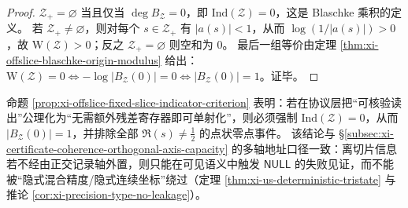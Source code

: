 \begin{proof}
\(\mathcal Z_{+}=\varnothing\) 当且仅当 \(\deg B_{\mathcal Z}=0\)，即 \(\mathrm{Ind}(\mathcal Z)=0\)，这是 Blaschke 乘积的定义。
若 \(\mathcal Z_{+}\neq\varnothing\)，则对每个 \(s\in\mathcal Z_{+}\) 有 \(|a(s)|<1\)，从而 \(\log(1/|a(s)|)>0\)，故 \(\mathrm{W}(\mathcal Z)>0\)；反之 \(\mathcal Z_{+}=\varnothing\) 则空和为 \(0\)。
最后一组等价由定理 \ref{thm:xi-offslice-blaschke-origin-modulus} 给出：\(\mathrm{W}(\mathcal Z)=0\iff -\log|B_{\mathcal Z}(0)|=0\iff |B_{\mathcal Z}(0)|=1\)。证毕。
\end{proof}

\begin{remark}\label{rem:xi-offslice-protocol-consequence}
命题 \ref{prop:xi-offslice-fixed-slice-indicator-criterion} 表明：若在协议层把“可核验读出”公理化为“无需额外残差寄存器即可单射化”，则必须强制 \(\mathrm{Ind}(\mathcal Z)=0\)，从而 \(|B_{\mathcal Z}(0)|=1\)，并排除全部 \(\Re(s)\neq\tfrac12\) 的点状零点事件。
该结论与 \S\ref{subsec:xi-certificate-coherence-orthogonal-axis-capacity} 的多轴地址口径一致：离切片信息若不经由正交记录轴外置，则只能在可见语义中触发 \(\mathsf{NULL}\) 的失败见证，而不能被“隐式混合精度/隐式连续坐标”绕过（定理 \ref{thm:xi-us-deterministic-tristate} 与推论 \ref{cor:xi-precision-type-no-leakage}）。
\end{remark}

\endinput

